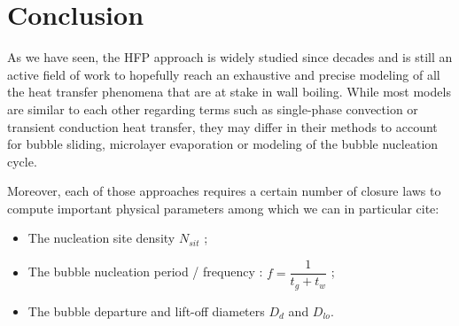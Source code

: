 \section{Conclusion}


As we have seen, the HFP approach is widely studied since decades and is still an active field of work to hopefully reach an exhaustive and precise modeling of all the heat transfer phenomena that are at stake in wall boiling. While most models are similar to each other regarding terms such as single-phase convection or transient conduction heat transfer, they may differ in their methods to account for bubble sliding, microlayer evaporation or modeling of the bubble nucleation cycle.

\npar

Moreover, each of those approaches requires a certain number of closure laws to compute important physical parameters among which we can in particular cite:
\begin{itemize}
\item The nucleation site density $N_{sit}$ ;
\item The bubble nucleation period / frequency : $f=\dfrac{1}{t_{g}+t_{w}}$ ;
\item The bubble departure and lift-off diameters $D_{d}$ and $D_{lo}$.
\end{itemize}

\npar

